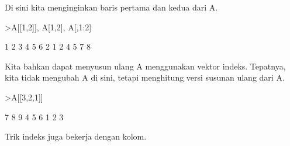 \documentclass[a4paper,10pt]{article}
\begin{document}
\begin{eulernotebook}
\begin{eulercomment}
Di sini kita menginginkan baris pertama dan kedua dari A.
\end{eulercomment}
\begin{eulerprompt}
>A[[1,2]], A[1,2], A[,1:2]
\end{eulerprompt}
\begin{euleroutput}
              1             2             3 
              4             5             6 
  2
              1             2 
              4             5 
              7             8 
\end{euleroutput}
\begin{eulercomment}
Kita bahkan dapat menyusun ulang A menggunakan vektor indeks.
Tepatnya, kita tidak mengubah A di sini, tetapi menghitung versi
susunan ulang dari A.
\end{eulercomment}
\begin{eulerprompt}
>A[[3,2,1]]
\end{eulerprompt}
\begin{euleroutput}
              7             8             9 
              4             5             6 
              1             2             3 
\end{euleroutput}
\begin{eulercomment}
Trik indeks juga bekerja dengan kolom.


\end{eulercomment}
\end{eulernotebook}
\end{document}
